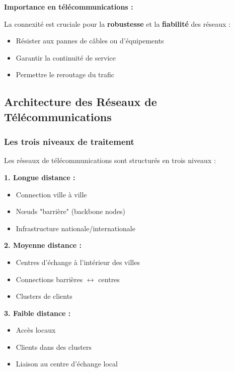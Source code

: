 \documentclass[12pt,a4paper]{article}
\begin{document}
\begin{notecours}
\textbf{Importance en télécommunications :}

La connexité est cruciale pour la \textcolor{importantrouge}{\textbf{robustesse}} et la \textcolor{defvert}{\textbf{fiabilité}} des réseaux :
\begin{itemize}
    \item Résister aux pannes de câbles ou d'équipements
    \item Garantir la continuité de service
    \item Permettre le reroutage du trafic
\end{itemize}
\end{notecours}

\newpage
\subsection{Architecture des Réseaux de Télécommunications}

\subsubsection{Les trois niveaux de traitement}

\begin{definition}
Les réseaux de télécommunications sont structurés en trois niveaux :

\textbf{1. Longue distance :}
\begin{itemize}
    \item Connection ville à ville
    \item Nœuds "barrière" (backbone nodes)
    \item Infrastructure nationale/internationale
\end{itemize}

\textbf{2. Moyenne distance :}
\begin{itemize}
    \item Centres d'échange à l'intérieur des villes
    \item Connections barrières $\leftrightarrow$ centres
    \item Clusters de clients
\end{itemize}

\textbf{3. Faible distance :}
\begin{itemize}
    \item Accès locaux
    \item Clients dans des clusters
    \item Liaison au centre d'échange local
\end{itemize}
\end{definition}
\end{document}
